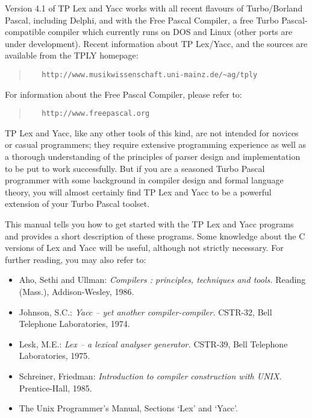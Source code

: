 \documentclass[a4paper]{article}
\begin{document}
Version 4.1 of TP Lex and Yacc works with all recent flavours of Turbo/Borland
Pascal, including Delphi, and with the Free Pascal Compiler, a free Turbo
Pascal-compatible compiler which currently runs on DOS and Linux (other ports
are under development). Recent information about TP Lex/Yacc, and the sources
are available from the TPLY homepage:
\begin{quote}\begin{verbatim}
   http://www.musikwissenschaft.uni-mainz.de/~ag/tply
\end{verbatim}\end{quote}
For information about the Free Pascal Compiler, please refer to:
\begin{quote}\begin{verbatim}
   http://www.freepascal.org
\end{verbatim}\end{quote}

TP Lex and Yacc, like any other tools of this kind, are not intended for
novices or casual programmers; they require extensive programming experience
as well as a thorough understanding of the principles of parser design and
implementation to be put to work successfully. But if you are a seasoned
Turbo Pascal programmer with some background in compiler design and formal
language theory, you will almost certainly find TP Lex and Yacc to be a
powerful extension of your Turbo Pascal toolset.

This manual tells you how to get started with the TP Lex and Yacc programs
and provides a short description of these programs. Some knowledge about
the C versions of Lex and Yacc will be useful, although not strictly
necessary. For further reading, you may also refer to:

\begin{itemize}
   \item
      Aho, Sethi and Ullman: {\em Compilers : principles, techniques and
      tools.\/} Reading (Mass.), Addison-Wesley, 1986.
   \item
      Johnson, S.C.: {\em Yacc -- yet another compiler-compiler.\/} CSTR-32,
      Bell Telephone Laboratories, 1974.
   \item
      Lesk, M.E.: {\em Lex -- a lexical analyser generator.\/} CSTR-39, Bell
      Telephone Laboratories, 1975.
   \item
      Schreiner, Friedman: {\em Introduction to compiler construction with
      UNIX.\/} Prentice-Hall, 1985.
   \item
      The Unix Programmer's Manual, Sections `Lex' and `Yacc'.
\end{itemize}
\end{document}

